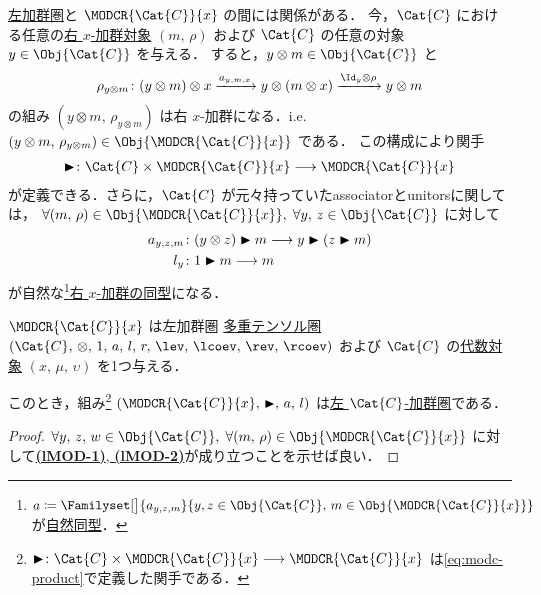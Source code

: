 \documentclass[TQFT_main]{subfiles}
\begin{document}
\hyperref[def:modulecat]{左加群圏}と $\MODCR{\Cat{C}}{x}$ の間には関係がある．
今，$\Cat{C}$ における任意の\hyperref[def:moduleobj]{右 $x$-加群対象} $(m,\, \rho)$ および $\Cat{C}$ の任意の対象 $y \in \Obj{\Cat{C}}$ を与える．
すると，$y \otimes m \in \Obj{\Cat{C}}$ と
\begin{align}
    \rho_{y \otimes m} \colon (y \otimes m) \otimes x \xrightarrow{a_{y,m,x}} y \otimes (m \otimes x) \xrightarrow{\Id_y \otimes \rho} y \otimes m
\end{align}
の組み $(y \otimes m,\, \rho_{y \otimes m})$ は右 $x$-加群になる．i.e. $(y \otimes m,\, \rho_{y \otimes m}) \in \Obj{\MODCR{\Cat{C}}{x}}$ である．
この構成により関手
\begin{align}
    \label{eq:modc-product}
    \btr \colon \Cat{C} \times \MODCR{\Cat{C}}{x} \lto \MODCR{\Cat{C}}{x}
\end{align}
が定義できる．さらに，$\Cat{C}$ が元々持っていたassociatorとunitorsに関しては，
$\forall (m,\, \rho) \in \Obj{\MODCR{\Cat{C}}{x}},\; \forall y,\,z \in \Obj{\Cat{C}}$ に対して
\begin{align}
    a_{y,z,m} &\colon (y \otimes z) \blacktriangleright m \longrightarrow y \blacktriangleright (z \blacktriangleright m) \\
    l_{y} &\colon 1 \blacktriangleright m \longrightarrow m
\end{align}
が自然な\footnote{$a \coloneqq \Familyset[\big]{a_{y,z,m}}{y,z \in \Obj{\Cat{C}},\, m \in \Obj{\MODCR{\Cat{C}}{x}}}$ が\hyperref[def:nat]{自然同型}．}\hyperref[def:hom-algmod]{右 $x$-加群の同型}になる．

\begin{myprop}[label=prop:modc-modcat]{$\MODCR{\Cat{C}}{x}$ は左加群圏}
    \hyperref[def:tensorfusion-cat]{多重テンソル圏} $(\Cat{C},\, \otimes,\, 1,\, a,\, l,\, r,\, \lev,\, \lcoev,\, \rev,\, \rcoev)$ および $\Cat{C}$ の\hyperref[def:algobj]{代数対象} $(x,\, \mu,\, \upsilon)$ を1つ与える．

    このとき，組み\footnote{$\btr \colon \Cat{C} \times \MODCR{\Cat{C}}{x} \lto \MODCR{\Cat{C}}{x}$ は\eqref{eq:modc-product}で定義した関手である．} $(\MODCR{\Cat{C}}{x},\, \btr,\, a,\, l)$ は\hyperref[def:modulecat]{左 $\Cat{C}$-加群圏}である．
\end{myprop}

\begin{proof}
    $\forall y,\,z,\, w \in \Obj{\Cat{C}},\; \forall (m,\, \rho) \in \Obj{\MODCR{\Cat{C}}{x}}$ に対して\hyperref[def:modulecat]{\textsf{\textbf{(lMOD-1)}}, \textsf{\textbf{(lMOD-2)}}}が成り立つことを示せば良い．
\end{proof}
\end{document}

